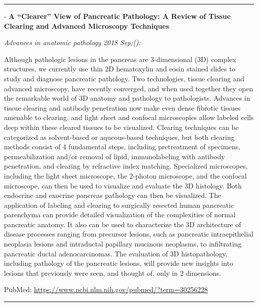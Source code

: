 \documentclass[]{article}
\begin{document}
\begin{center}\rule{0.5\linewidth}{\linethickness}\end{center}

 - \textbf{A ``Clearer'' View of Pancreatic Pathology: A Review of
Tissue Clearing and Advanced Microscopy Techniques}

\emph{Advances in anatomic pathology 2018 Sep;():}

Although pathologic lesions in the pancreas are 3-dimensional (3D)
complex structures, we currently use thin 2D hematoxylin and eosin
stained slides to study and diagnose pancreatic pathology. Two
technologies, tissue clearing and advanced microscopy, have recently
converged, and when used together they open the remarkable world of 3D
anatomy and pathology to pathologists. Advances in tissue clearing and
antibody penetration now make even dense fibrotic tissues amenable to
clearing, and light sheet and confocal microscopies allow labeled cells
deep within these cleared tissues to be visualized. Clearing techniques
can be categorized as solvent-based or aqueous-based techniques, but
both clearing methods consist of 4 fundamental steps, including
pretreatment of specimens, permeabilization and/or removal of lipid,
immunolabeling with antibody penetration, and clearing by refractive
index matching. Specialized microscopes, including the light sheet
microscope, the 2-photon microscope, and the confocal microscope, can
then be used to visualize and evaluate the 3D histology. Both endocrine
and exocrine pancreas pathology can then be visualized. The application
of labeling and clearing to surgically resected human pancreatic
parenchyma can provide detailed visualization of the complexities of
normal pancreatic anatomy. It also can be used to characterize the 3D
architecture of disease processes ranging from precursor lesions, such
as pancreatic intraepithelial neoplasia lesions and intraductal
papillary mucinous neoplasms, to infiltrating pancreatic ductal
adenocarcinomas. The evaluation of 3D histopathology, including
pathology of the pancreatic lesions, will provide new insights into
lesions that previously were seen, and thought of, only in 2 dimensions.

PubMed: \url{https://www.ncbi.nlm.nih.gov/pubmed/?term=30256228}

{}

{}

\begin{center}\rule{0.5\linewidth}{\linethickness}\end{center}
\end{document}
